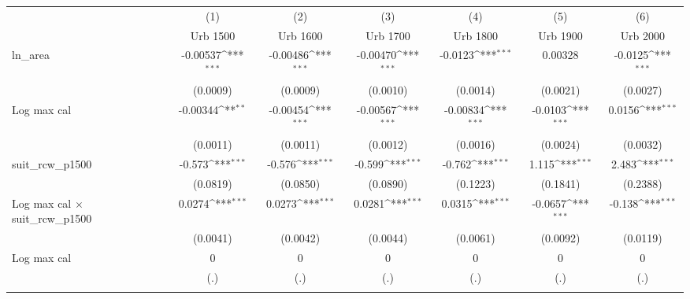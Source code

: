 {
\def\sym#1{\ifmmode^{#1}\else\(^{#1}\)\fi}
\begin{tabular}{l*{6}{c}}
\toprule
                    &\multicolumn{1}{c}{(1)}&\multicolumn{1}{c}{(2)}&\multicolumn{1}{c}{(3)}&\multicolumn{1}{c}{(4)}&\multicolumn{1}{c}{(5)}&\multicolumn{1}{c}{(6)}\\
                    &\multicolumn{1}{c}{Urb 1500}&\multicolumn{1}{c}{Urb 1600}&\multicolumn{1}{c}{Urb 1700}&\multicolumn{1}{c}{Urb 1800}&\multicolumn{1}{c}{Urb 1900}&\multicolumn{1}{c}{Urb 2000}\\
\midrule
ln\_area             &    -0.00537\sym{***}&    -0.00486\sym{***}&    -0.00470\sym{***}&     -0.0123\sym{***}&     0.00328         &     -0.0125\sym{***}\\
                    &    (0.0009)         &    (0.0009)         &    (0.0010)         &    (0.0014)         &    (0.0021)         &    (0.0027)         \\
\addlinespace
Log max cal         &    -0.00344\sym{**} &    -0.00454\sym{***}&    -0.00567\sym{***}&    -0.00834\sym{***}&     -0.0103\sym{***}&      0.0156\sym{***}\\
                    &    (0.0011)         &    (0.0011)         &    (0.0012)         &    (0.0016)         &    (0.0024)         &    (0.0032)         \\
\addlinespace
suit\_rcw\_p1500      &      -0.573\sym{***}&      -0.576\sym{***}&      -0.599\sym{***}&      -0.762\sym{***}&       1.115\sym{***}&       2.483\sym{***}\\
                    &    (0.0819)         &    (0.0850)         &    (0.0890)         &    (0.1223)         &    (0.1841)         &    (0.2388)         \\
\addlinespace
Log max cal $\times$ suit\_rcw\_p1500&      0.0274\sym{***}&      0.0273\sym{***}&      0.0281\sym{***}&      0.0315\sym{***}&     -0.0657\sym{***}&      -0.138\sym{***}\\
                    &    (0.0041)         &    (0.0042)         &    (0.0044)         &    (0.0061)         &    (0.0092)         &    (0.0119)         \\
\addlinespace
Log max cal         &           0         &           0         &           0         &           0         &           0         &           0         \\
                    &         (.)         &         (.)         &         (.)         &         (.)         &         (.)         &         (.)         \\
\addlinespace

\end{tabular}}
